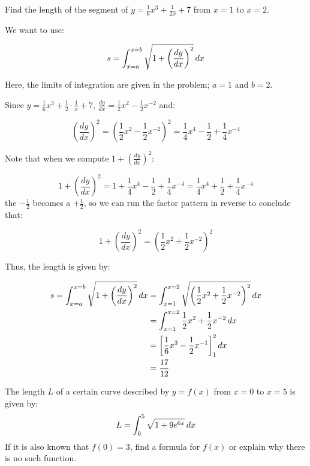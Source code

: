\documentclass[]{ximera}
\begin{document}
\begin{problem}
Find the length of the segment of $y= \frac{1}{6}x^3 + \frac{1}{2x}+7$ from $x=1$ to $x=2$.
\end{problem}

\begin{freeResponse}
We want to use:

\[
s = \int_{x=a}^{x=b} \sqrt{1+\left(\frac{dy}{dx}\right)^2} \mathop{}\!d x
\]

Here, the limits of integration are given in the problem; $a=1$ and $b=2$.  

Since $y=\frac{1}{6}x^3 + \frac{1}{2}\cdot\frac{1}{x}+7$, $\frac{dy}{dx} = \frac{1}{2}x^2 -\frac{1}{2}x^{-2}$ and:

\[
\left(\frac{dy}{dx}\right)^2 = \left(\frac{1}{2}x^2 -\frac{1}{2}x^{-2}\right)^2 = \frac{1}{4} x^4 -\frac{1}{2} + \frac{1}{4}x^{-4}
\]

Note that when we compute $1+\left(\frac{dy}{dx}\right)^2$:

\[
1+\left(\frac{dy}{dx}\right)^2 = 1+ \frac{1}{4} x^4 -\frac{1}{2} + \frac{1}{4}x^{-4} = \frac{1}{4} x^4 + \frac{1}{2} + \frac{1}{4}x^{-4}
\]
the $-\frac{1}{2}$ becomes a $+\frac{1}{2}$, so we can run the factor pattern in reverse to conclude that:

\[
1+\left(\frac{dy}{dx}\right)^2 = \left(\frac{1}{2}x^2 +\frac{1}{2}x^{-2}\right)^2
\]

Thus, the length is given by:

\begin{align*}
s = \int_{x=a}^{x=b} \sqrt{1+\left(\frac{dy}{dx}\right)^2} \mathop{}\!d x &=  \int_{x=1}^{x=2} \sqrt{  \left(\frac{1}{2}x^2 +\frac{1}{2}x^{-2}\right)^2  } \mathop{}\!d x\\
&=  \int_{x=1}^{x=2} \frac{1}{2}x^2 +\frac{1}{2}x^{-2} \mathop{}\!d x\\
&=  \bigg[ \frac{1}{6}x^3 -\frac{1}{2}x^{-1} \bigg]_1^2 \mathop{}\!d x\\
&= \frac{17}{12}
\end{align*}


\end{freeResponse}




\begin{problem}
The length $L$ of a certain curve described by $y=f(x)$ from $x=0$ to $x=5$ is given by:
\[
L = \int_0^5 \sqrt{1+9e^{6x}} \mathop{}\!d x
\]
If it is also known that $f(0)=3$, find a formula for $f(x)$ or explain why there is no such function. 
\end{problem}
\end{document}
